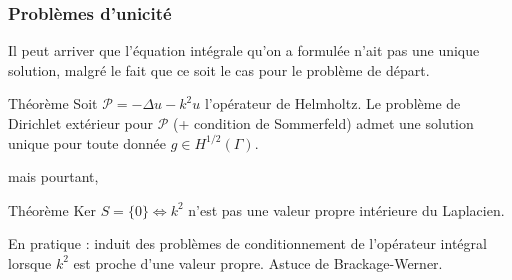 \documentclass[11pt]{beamer}
\begin{document}
		\begin{frame}
			\frametitle{Problèmes d'unicité}
			Il peut arriver que l'équation intégrale qu'on a formulée n'ait pas une unique solution, malgré le fait que ce soit le cas pour le problème de départ.
			\begin{block}{Théorème}
				Soit $\mathcal{P} = -\Delta u - k^2u$ l'opérateur de Helmholtz. Le problème de Dirichlet extérieur pour $\mathcal{P}$ (+ condition de Sommerfeld) admet une solution unique pour toute donnée $g \in H^{1/2}(\Gamma)$. 
			\end{block}
			mais pourtant,
			\begin{block}{Théorème}
				$\text{Ker }S = \{0\} \Leftrightarrow k^2$ n'est pas une valeur propre intérieure du Laplacien.   
			\end{block}
			En pratique : induit des problèmes de conditionnement de l'opérateur intégral lorsque $k^2$ est proche d'une valeur propre. Astuce de Brackage-Werner. 
		\end{frame}
\end{document}
